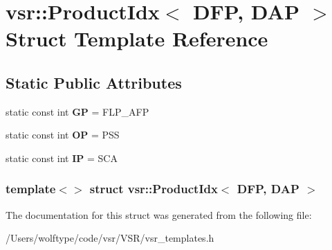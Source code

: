 \hypertarget{structvsr_1_1_product_idx_3_01_d_f_p_00_01_d_a_p_01_4}{\section{vsr\-:\-:Product\-Idx$<$ D\-F\-P, D\-A\-P $>$ Struct Template Reference}
\label{structvsr_1_1_product_idx_3_01_d_f_p_00_01_d_a_p_01_4}
}
\subsection*{Static Public Attributes}
\begin{DoxyCompactItemize}
\item 
\hypertarget{structvsr_1_1_product_idx_3_01_d_f_p_00_01_d_a_p_01_4_a4343df86636286c6c567e391e8c5df45}{static const int {\bfseries G\-P} = F\-L\-P\-\_\-\-A\-F\-P}\label{structvsr_1_1_product_idx_3_01_d_f_p_00_01_d_a_p_01_4_a4343df86636286c6c567e391e8c5df45}

\item 
\hypertarget{structvsr_1_1_product_idx_3_01_d_f_p_00_01_d_a_p_01_4_ad46cc2a2743afa422bc85fc63f646ade}{static const int {\bfseries O\-P} = P\-S\-S}\label{structvsr_1_1_product_idx_3_01_d_f_p_00_01_d_a_p_01_4_ad46cc2a2743afa422bc85fc63f646ade}

\item 
\hypertarget{structvsr_1_1_product_idx_3_01_d_f_p_00_01_d_a_p_01_4_a490d1d0a41c7ea8a0637db459bf69534}{static const int {\bfseries I\-P} = S\-C\-A}\label{structvsr_1_1_product_idx_3_01_d_f_p_00_01_d_a_p_01_4_a490d1d0a41c7ea8a0637db459bf69534}

\end{DoxyCompactItemize}
\subsubsection*{template$<$$>$ struct vsr\-::\-Product\-Idx$<$ D\-F\-P, D\-A\-P $>$}



The documentation for this struct was generated from the following file\-:\begin{DoxyCompactItemize}
\item 
/\-Users/wolftype/code/vsr/\-V\-S\-R/vsr\-\_\-templates.\-h\end{DoxyCompactItemize}
